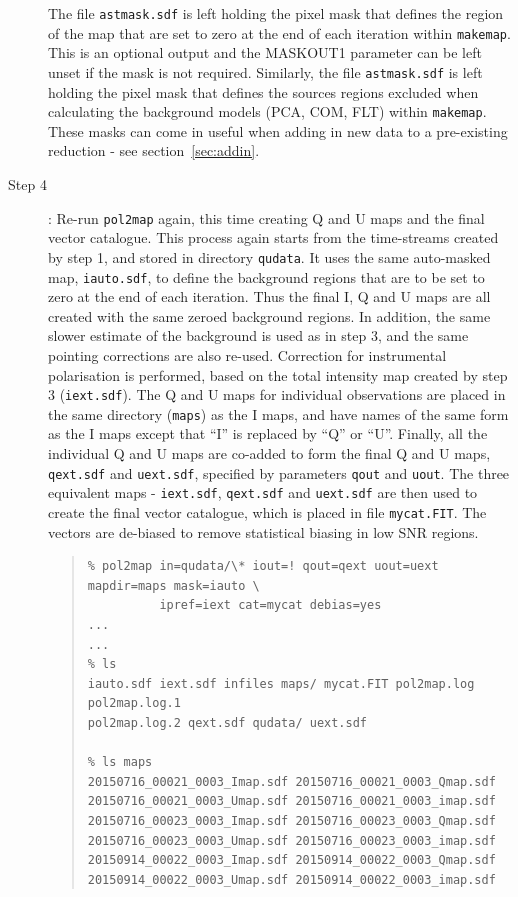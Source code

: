 \documentclass[twoside,11pt]{starlink}
\begin{document}
\begin{description}
The file \texttt{astmask.sdf} is left holding the pixel mask that defines
the region of the map that are set to zero at the end of each iteration
within \texttt{makemap}. This is an optional output and the MASKOUT1
parameter can be left unset if the mask is not required. Similarly, the
file \texttt{astmask.sdf} is left holding the pixel mask that defines the
sources regions excluded when calculating the background models (PCA, COM,
FLT) within \texttt{makemap}. These masks can come in useful when adding
in new data to a pre-existing reduction - see section~\ref{sec:addin}.

\item[Step 4]:  Re-run \texttt{pol2map} again, this time creating Q and U
maps and the final vector catalogue. This process again starts from the
time-streams created by step 1, and stored in directory \texttt{qudata}.
It uses the same auto-masked map, \texttt{iauto.sdf}, to define the
background regions that are to be set to zero at the end of each
iteration. Thus the final I, Q and U maps are all created with the same
zeroed background regions. In addition, the same slower estimate of the
background is used as in step 3, and the same pointing corrections are
also re-used. Correction for instrumental polarisation is performed,
based on the total intensity map created by step 3 (\texttt{iext.sdf}).
The Q and U maps for individual observations are placed in the same
directory (\texttt{maps}) as the I maps, and have names of the same form
as the I maps except that ``I'' is replaced by ``Q'' or ``U''. Finally,
all the individual Q and U maps are co-added to form the final Q and U
maps, \texttt{qext.sdf} and \texttt{uext.sdf}, specified by parameters
\texttt{qout} and \texttt{uout}. The three equivalent maps -
\texttt{iext.sdf}, \texttt{qext.sdf} and \texttt{uext.sdf} are then used
to create the final vector catalogue, which is placed in file
\texttt{mycat.FIT}. The vectors are de-biased to remove statistical
biasing in low SNR regions.

\begin{quote}
\begin{verbatim}
% pol2map in=qudata/\* iout=! qout=qext uout=uext mapdir=maps mask=iauto \
          ipref=iext cat=mycat debias=yes
...
...
% ls
iauto.sdf iext.sdf infiles maps/ mycat.FIT pol2map.log pol2map.log.1
pol2map.log.2 qext.sdf qudata/ uext.sdf

% ls maps
20150716_00021_0003_Imap.sdf 20150716_00021_0003_Qmap.sdf
20150716_00021_0003_Umap.sdf 20150716_00021_0003_imap.sdf
20150716_00023_0003_Imap.sdf 20150716_00023_0003_Qmap.sdf
20150716_00023_0003_Umap.sdf 20150716_00023_0003_imap.sdf
20150914_00022_0003_Imap.sdf 20150914_00022_0003_Qmap.sdf
20150914_00022_0003_Umap.sdf 20150914_00022_0003_imap.sdf

\end{verbatim}
\end{quote}


\end{description}
\end{document}
